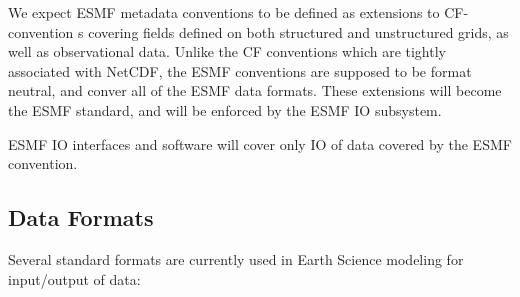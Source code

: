 We expect ESMF metadata conventions to be defined as extensions to
CF-convention s covering fields defined on both structured and
unstructured grids, as well as observational data. Unlike the CF
conventions which are tightly associated with NetCDF, the ESMF
conventions are supposed to be format neutral, and conver all of the
ESMF data formats.  These extensions will become the ESMF standard,
and will be enforced by the ESMF IO subsystem.

ESMF I\/O interfaces and software will cover only I\/O of data covered by
the ESMF convention.




\subsection{Data Formats}



Several standard formats are currently used in Earth Science modeling
for input/output of data:

